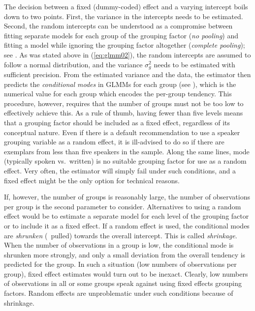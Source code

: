 The decision between a fixed (dummy-coded) effect and a varying intercept boils down to two points.
First, the variance in the intercepts needs to be estimated.
Second, the random intercepts can be understood as a compromise between fitting separate models for each group of the grouping factor (\textit{no pooling}) and fitting a model while ignoring the grouping factor altogether (\textit{complete pooling}); see \citet[Ch.~12]{GelmanHill2006}.
As was stated above in (\ref{eq:glmm02}), the random intercepts are assumed to follow a normal distribution, and the variance $\sigma_g^2$ needs to be estimated with sufficient precision.
From the estimated variance and the data, the estimator then predicts the \textit{conditional modes} in GLMMs for each group (see \citealt[Ch.~1]{Bates2010}), which is the numerical value for each group which encodes the per-group tendency.
This procedure, however, requires that the number of groups must not be too low to effectively achieve this.
As a rule of thumb, having fewer than five levels means that a grouping factor should be included as a fixed effect, regardless of its conceptual nature.
Even if there is a default recommendation to use a speaker grouping variable as a random effect, it is ill-advised to do so if there are exemplars from less than five speakers in the sample.
Along the same lines, mode (typically spoken vs.\ written) is no suitable grouping factor for use as a random effect.
Very often, the estimator will simply fail under such conditions, and a fixed effect might be the only option for technical reasons.

If, however, the number of groups is reasonably large, the number of observations per group is the second parameter to consider.
Alternatives to using a random effect would be to estimate a separate model for each level of the grouping factor or to include it as a fixed effect.
If a random effect is used, the conditional modes are \textit{shrunken} (\ie\ pulled) towards the overall intercept.
This is called \textit{shrinkage}.
When the number of observations in a group is low, the conditional mode is shrunken more strongly, and only a small deviation from the overall tendency is predicted for the group.
In such a situation (low numbers of observations per group), fixed effect estimates would turn out to be inexact.
Clearly, low numbers of observations in all or some groups speak against using fixed effects grouping factors.
Random effects are unproblematic under such conditions because of shrinkage.

